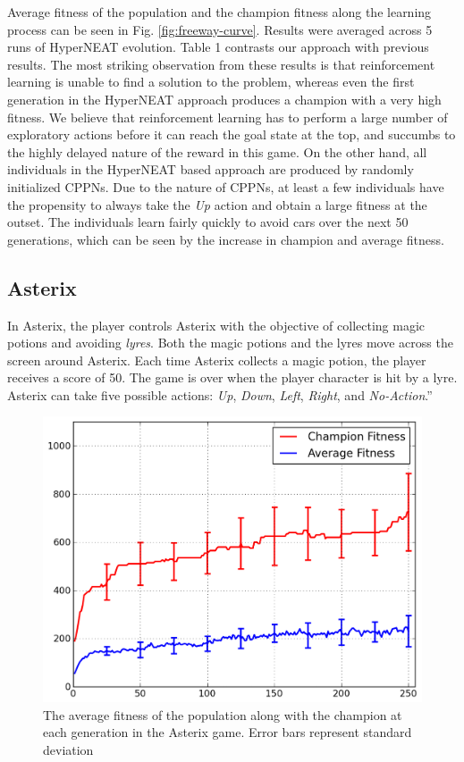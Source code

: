 \documentclass{acm_proc_article-sp}
\begin{document}
Average fitness of the population and the champion fitness along the learning process can be seen in Fig. \ref{fig:freeway-curve}. Results were averaged across 5 runs of HyperNEAT evolution. Table 1 contrasts our approach with previous results. The most striking observation from these results is that reinforcement learning is unable to find a solution to the problem, whereas even the first generation in the HyperNEAT approach produces a champion with a very high fitness. We believe that reinforcement learning has to perform a large number of exploratory actions before it can reach the goal state at the top, and succumbs to the highly delayed nature of the reward in this game. On the other hand, all individuals in the HyperNEAT based approach are produced by randomly initialized CPPNs. Due to the nature of CPPNs, at least a few individuals have the propensity to always take the \textit{Up} action and obtain a large fitness at the outset. The individuals learn fairly quickly to avoid cars over the next 50 generations, which can be seen by the increase in champion and average fitness.

\subsection {Asterix}
In Asterix, the player controls Asterix with the objective of collecting magic potions and avoiding \textit{lyres}. Both the magic potions and the lyres move across the screen around Asterix. Each time Asterix collects a magic potion, the player receives a score of 50. The game is over when the player character is hit by a lyre. Asterix can take five possible actions: \textit{Up}, \textit{Down}, \textit{Left}, \textit{Right}, and \textit{No-Action}.''

\begin{figure}[ht]
\begin{center}
\includegraphics[width=\columnwidth]{figures/asterix-results.png}
\end{center}
\caption{The average fitness of the population along with the champion at each generation in the Asterix game. Error bars represent standard deviation}
\label{fig:asterix-curve}
\end{figure}
\end{document}
